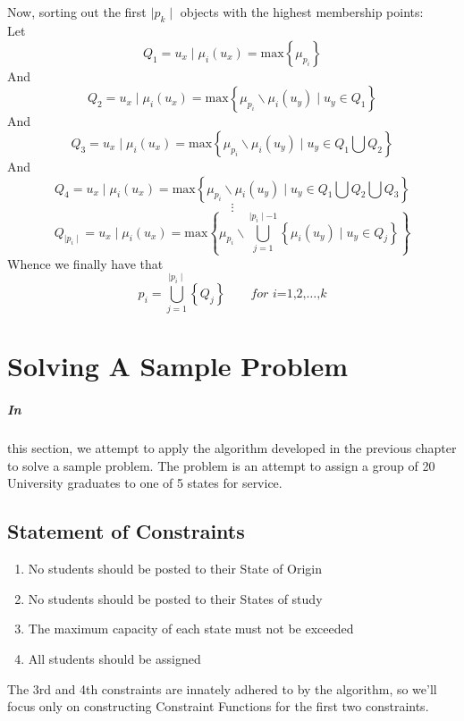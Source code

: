 \documentclass[a4paper,openany]{book}
\begin{document}
			\paragraph{}
				Now, sorting out the first $\mid p_k \mid$ objects with the highest membership points:\\
				Let
					\begin{equation}
						Q_1 = u_x \mid \mu_i(u_x) = \text{max}\left\{ \mu_{p_i} \right\}
					\end{equation}
				And
					\begin{equation}
						Q_2 = u_x \mid \mu_i(u_x) = \text{max}\left\{ \mu_{p_i} \backslash \mu_i(u_y) \mid u_y \in Q_1 \right\}
					\end{equation}
				And
					\begin{equation}
						Q_3 = u_x \mid \mu_i(u_x) = \text{max}\left\{ \mu_{p_i} \backslash \mu_i(u_y) \mid u_y \in Q_1 \bigcup Q_2 \right\}
					\end{equation}
				And
					\begin{equation}
						Q_4 = u_x \mid \mu_i(u_x) = \text{max}\left\{ \mu_{p_i} \backslash \mu_i(u_y) \mid u_y \in Q_1 \bigcup Q_2 \bigcup Q_3 \right\}
					\end{equation}
					\[
						\vdots
					\]
					\begin{equation}
						Q_{\mid p_i \mid} = u_x \mid \mu_i(u_x) = \text{max}\left\{ \mu_{p_i} \backslash \bigcup_{j=1}^{\mid p_i \mid - 1} \left\{  \mu_i(u_y) \mid u_y \in Q_j \right\} \right\}
					\end{equation}
				Whence we finally have that
					\begin{equation}
						p_i = \bigcup_{j=1}^{\mid p_i \mid}\left\{Q_j\right\} \qquad \textit{for i=1,2,}\dots\text{,}k
					\end{equation}
	\chapter{Solving A Sample Problem}
		\paragraph{In}
			this section, we attempt to apply the algorithm developed in the previous chapter to solve a sample problem. The problem is an attempt to assign a group of 20 University graduates to one of 5 states for service.
		
		\section{Statement of Constraints}
			\begin{enumerate}
				\item No students should be posted to their State of Origin
				\item No students should be posted to their States of study
				\item The maximum capacity of each state must not be exceeded
				\item All students should be assigned
			\end{enumerate}
			The 3rd and 4th constraints are innately adhered to by the algorithm, so we'll focus only on constructing Constraint Functions for the first two constraints.
\end{document}

